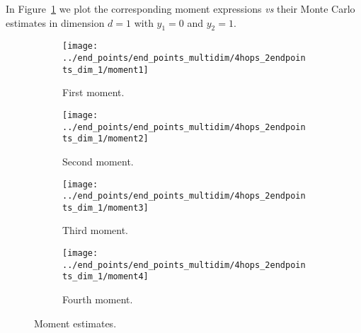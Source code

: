 \documentclass[12pt]{article}
\numberwithin{equation}{section}
\begin{document}
\begin{table}[H] 
  \centering
\scriptsize %
{}
\caption{Computation times and counts of connected non-flat {\em vs} all partitions in $\Pi ([n]\times[3])$.}
\label{t1-1-2}
\end{table} 

\vspace{-0.4cm}

\noindent
 In Figure~\ref{fig2-11} we plot the corresponding
 moment expressions {\em vs} their Monte Carlo estimates
 in dimension $d=1$ with $y_1 = 0$ and $y_2 = 1$. 

\begin{figure}[H]
  \centering
 \begin{subfigure}[b]{0.49\textwidth}
    \texttt{[image: ../end\_points/end\_points\_multidim/4hops\_2endpoints\_dim\_1/moment1]} 
    \caption{First moment.} 
 \end{subfigure}
 \begin{subfigure}[b]{0.49\textwidth}
    \texttt{[image: ../end\_points/end\_points\_multidim/4hops\_2endpoints\_dim\_1/moment2]} 
    \caption{Second moment.} 
 \end{subfigure}
 \begin{subfigure}[b]{0.50\textwidth}
 \hskip-0.5cm
    \texttt{[image: ../end\_points/end\_points\_multidim/4hops\_2endpoints\_dim\_1/moment3]} 
    \caption{Third moment.} 
 \end{subfigure}
  \centering
  \begin{subfigure}[b]{0.49\textwidth}
  \hskip-0.3cm
    \texttt{[image: ../end\_points/end\_points\_multidim/4hops\_2endpoints\_dim\_1/moment4]} 
    \caption{Fourth moment.} 
 \end{subfigure}
  \caption{Moment estimates.} 
\label{fig2-11} 
\end{figure}
\end{document}
